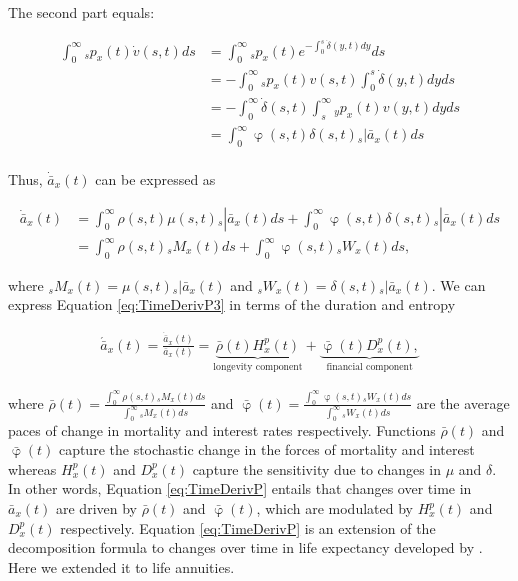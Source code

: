 \documentclass[12pt]{article}
\begin{document}
The second part equals:

\begin{equation}\label{eq:TimeDerivP2}
\begin{split}
\int_0^\infty {}_sp_x(t) \dot{v}(s,t)ds &= \int_0^\infty {}_sp_x(t)  e^{-\int_0^{s}\dot{\delta}(y,t)dy}ds\\
&= -\int_0^\infty {}_sp_x(t) v(s,t) \int_0^{s}\dot{\delta}(y,t)dy ds\\
&= -\int_0^\infty  \dot{\delta}(s,t)\int_s^{\infty} {}_yp_x(t) v(y,t) dy ds\\
&= \int_0^\infty  \upvarphi(s,t) \delta(s,t)  {}_s|\bar{a}_x(t) ds\\
\end{split}
\end{equation}


Thus, $\dot{\bar{a}} _x(t)$ can be expressed as


\begin{equation}\label{eq:TimeDerivP3}
\begin{split}
\dot{\bar{a}}_{x}(t) &=  \int_0^\infty \rho(s,t) \mu(s,t){}_s|\bar{a}_x(t) ds +\int_0^\infty  \upvarphi(s,t) \delta(s,t)  {}_s|\bar{a}_x(t) ds\\
&= \int_0^\infty \rho(s,t) {}_sM_x(t)  ds +\int_0^\infty  \upvarphi(s,t) {}_sW_x(t)  ds,
\end{split}
\end{equation}


where ${}_sM_x(t)= \mu(s,t){}_s|\bar{a}_x(t)$ and ${}_sW_x(t)=\delta(s,t)  {}_s|\bar{a}_x(t)$. We can express Equation \ref{eq:TimeDerivP3} in terms of the duration and entropy


\begin{equation}\label{eq:TimeDerivP}
\begin{split}
 \acute{\bar{a}}_x(t) = \frac{\dot{\bar{a}}_x(t)}{\bar{a}_x(t)}  = 
 \underbrace{\bar{\rho}(t){H}^{p}_x(t)}_\text{longevity component}
 +\underbrace{\bar{\upvarphi}(t){D}^{p}_x(t),}_\text{financial component}
\end{split}
\end{equation}

where $\bar{\rho}(t)= \frac{\int_0^\infty \rho(s,t) {}_sM_x(t)  ds}{\int_0^\infty  {}_sM_x(t)ds}$ and 
$\bar{\upvarphi}(t)= \frac{\int_0^\infty \upvarphi(s,t) {}_sW_x(t)  ds}{\int_0^\infty {}_sW_x(t) ds}$ are the average paces of change in mortality and interest rates respectively. Functions $\bar{\rho}(t)$ and $\bar{\upvarphi}(t)$ capture the stochastic change in the forces of mortality and interest whereas ${H}^{p}_x(t)$ and ${D}^{p}_x(t)$ capture the sensitivity due to changes in $\mu$ and $\delta$. In other words, Equation \ref{eq:TimeDerivP} entails that changes over time in $\bar{a}_x(t)$ are driven by $\bar{\rho}(t)$ and $\bar{\upvarphi}(t)$, which are modulated by ${H}^{p}_x(t)$ and ${D}^{p}_x(t)$ respectively. Equation \ref{eq:TimeDerivP} is an extension of the decomposition formula to changes over time in life expectancy developed by \citet{Vaupel2003}. Here we extended it to life annuities.
\end{document}
